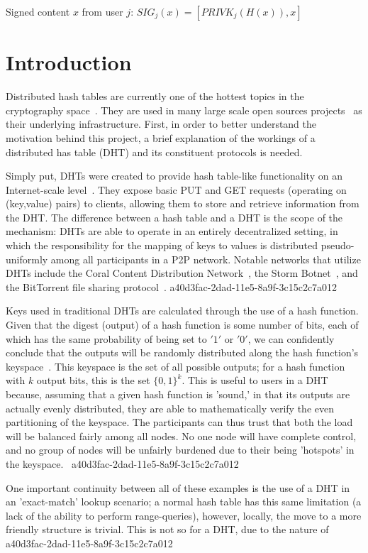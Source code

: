 \documentclass[12pt]{article}
\begin{document}
Signed content $x$ from user $j$: $SIG_j(x) = \left[ PRIVK_j( H(x) ), x \right]$

\section{Introduction}
\par Distributed hash tables are currently one of the hottest topics in the cryptography space~\cite{Stoica:2001dj,Rowstron:2001ea,Ratnasamy:2001wn}. They are used in many large scale open sources projects~\cite{Freitas:2013tb,Xu:2010vs,Perfitt:2010fh} as their underlying infrastructure. First, in order to better understand the motivation behind this project, a brief explanation of the workings of a distributed has table (DHT) and its constituent protocols is needed.

\par Simply put, DHTs were created to provide hash table-like functionality on an Internet-scale level~\cite{Ratnasamy:2001wn}. They expose basic PUT and GET requests (operating on (key,value) pairs) to clients, allowing them to store and retrieve information from the DHT. The difference between a hash table and a DHT is the scope of the mechanism: DHTs are able to operate in an entirely decentralized setting, in which the responsibility for the mapping of keys to values is distributed pseudo-uniformly among all participants in a P2P network. Notable networks that utilize DHTs include the Coral Content Distribution Network~\cite{Freedman:2004vb}, the Storm Botnet~\cite{Holz:2008uk}, and the BitTorrent file sharing protocol~\cite{Cohen:y1_8mBnw}.
a40d3fac-2dad-11e5-8a9f-3c15c2c7a012
\par Keys used in traditional DHTs are calculated through the use of a hash function. Given that the digest (output) of a hash function is some number of bits, each of which has the same probability of being set to $'1'$ or $'0'$, we can confidently conclude that the outputs will be randomly distributed along the hash function's keyspace~. This keyspace is the set of all possible outputs; for a hash function with $k$ output bits, this is the set $\{0,1\}^k$. This is useful to users in a DHT because, assuming that a given hash function is 'sound,' in that its outputs are actually evenly distributed, they are able to mathematically verify the even partitioning of the keyspace. The participants can thus trust that both the load will be balanced fairly among all nodes. No one node will have complete control, and no group of nodes will be unfairly burdened due to their being 'hotspots' in the keyspace.~
a40d3fac-2dad-11e5-8a9f-3c15c2c7a012
\par One important continuity between all of these examples is the use of a DHT in an 'exact-match' lookup scenario; a normal hash table has this same limitation (a lack of the ability to perform range-queries), however, locally, the move to a more friendly structure is trivial. This is not so for a DHT, due to the nature of
\printbibliography
a40d3fac-2dad-11e5-8a9f-3c15c2c7a012
\end{document}
